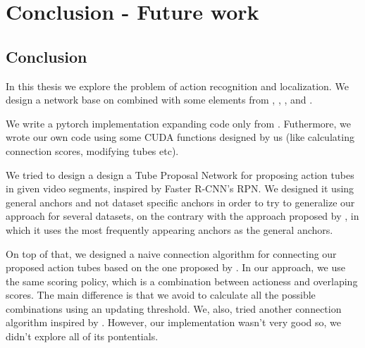 


% 

\chapter{Conclusion - Future work}

\section{Conclusion}
In this thesis we explore the problem of action recognition and localization. We design a network base on \cite{DBLP:journals/corr/HouCS17}
combined with some elements from \cite{DBLP:journals/corr/abs-1712-09184}, \cite{Ren:2015:FRT:2969239.2969250}, \cite{Girshick:2015:FR:2919332.2920125},
\cite{DBLP:journals/corr/abs-1903-00304} and \cite{hara3dcnns}. \par

We write a pytorch implementation expanding code only from \cite{jjfaster2rcnn}. Futhermore, we wrote our own code using some CUDA functions designed by us (like
calculating connection scores, modifying tubes etc). \par

We tried to design a design a Tube Proposal Network for proposing action tubes in given video segments, inspired by Faster R-CNN's RPN.
We designed it using general anchors and not dataset specific anchors in order to try to generalize our approach for several datasets, on the contrary with
the approach proposed by \cite{DBLP:journals/corr/abs-1712-09184}, in which it uses the most frequently appearing anchors as the general anchors. \par

On top of that, we designed a naive connection algorithm for connecting  our proposed action tubes based on the one proposed by \cite{DBLP:journals/corr/abs-1712-09184}.
In our approach, we use the same scoring policy, which is a combination between actioness and overlaping scores. The main difference is that we avoid to calculate
all the possible combinations using an updating threshold. We, also, tried another connection algorithm inspired by \cite{DBLP:journals/corr/abs-1903-00304}. However,
our implementation wasn't very good so, we didn't explore all of its pontentials. \par

